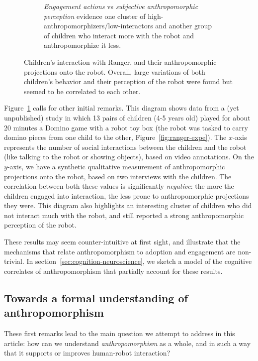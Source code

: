 \documentclass{frontiersSCNS} %
\begin{document}
\begin{figure}[b]
\begin{subfigure}[b]{0.48\columnwidth}
            \caption{\emph{Engagement actions} vs \textit{subjective anthropomorphic
                perception} evidence one cluster of
                high-anthropomorphizers/low-interactors and another group of children who
                interact more with the robot and anthropomorphize it less.}
            \label{fig:qualitative-score}
        \end{subfigure}
        \caption{Children's interaction with Ranger, and their anthropomorphic
        projections onto the robot. Overall, large variations of both children's
        behavior and their perception of the robot were found but seemed to be
        correlated to each other.}
    \label{fig:ranger}
\end{figure}


Figure~\ref{fig:qualitative-score} calls for other initial remarks. This diagram
shows data from a (yet unpublished) study in which 13 pairs of children (4-5
years old) played for about 20 minutes a Domino game with a robot toy box (the
robot was tasked to carry domino pieces from one child to the other,
Figure~\ref{fig:ranger-expe}).  The $x$-axis represents the number of social
interactions between the children and the robot (like talking to the robot or
showing objects), based on video annotations. On the $y$-axis, we have a
synthetic qualitative measurement of anthropomorphic projections onto the robot,
based on two interviews with the children. The correlation between both these
values is significantly \emph{negative}: the more the children engaged into
interaction, the less prone to anthropomorphic projections they were. This
diagram also highlights an interesting cluster of children who did not interact
much with the robot, and still reported a strong anthropomorphic perception of
the robot.

These results may seem counter-intuitive at first sight, and illustrate that the
mechanisms that relate anthropomorphism to adoption and engagement are
non-trivial. In section~\ref{sec:cognition-neuroscience}, we sketch a model of
the cognitive correlates of anthropomorphism that partially account for these
results.


\subsection{Towards a formal understanding of anthropomorphism}

These first remarks lead to the main question we attempt to address in this
article: how can we understand \emph{anthropomorphism} as a whole, and in such a
way that it supports or improves human-robot interaction?
\end{document}
